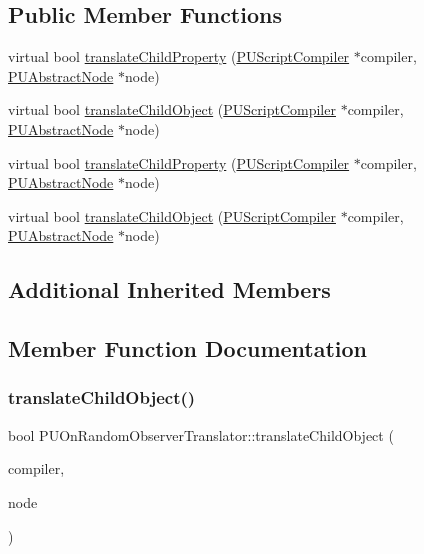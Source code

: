 \subsection*{Public Member Functions}
\begin{DoxyCompactItemize}
\item 
virtual bool \hyperlink{classPUOnRandomObserverTranslator_a33a307763b47576300326fd858593998}{translate\+Child\+Property} (\hyperlink{classPUScriptCompiler}{P\+U\+Script\+Compiler} $\ast$compiler, \hyperlink{classPUAbstractNode}{P\+U\+Abstract\+Node} $\ast$node)
\item 
virtual bool \hyperlink{classPUOnRandomObserverTranslator_a5525f9a0d010de6c1fc7ea96fa235b5d}{translate\+Child\+Object} (\hyperlink{classPUScriptCompiler}{P\+U\+Script\+Compiler} $\ast$compiler, \hyperlink{classPUAbstractNode}{P\+U\+Abstract\+Node} $\ast$node)
\item 
virtual bool \hyperlink{classPUOnRandomObserverTranslator_abd476e7be1a8439a15b0ed5ec53074e4}{translate\+Child\+Property} (\hyperlink{classPUScriptCompiler}{P\+U\+Script\+Compiler} $\ast$compiler, \hyperlink{classPUAbstractNode}{P\+U\+Abstract\+Node} $\ast$node)
\item 
virtual bool \hyperlink{classPUOnRandomObserverTranslator_a09e3fe0070c74ce00dc9d6a93cc982a6}{translate\+Child\+Object} (\hyperlink{classPUScriptCompiler}{P\+U\+Script\+Compiler} $\ast$compiler, \hyperlink{classPUAbstractNode}{P\+U\+Abstract\+Node} $\ast$node)
\end{DoxyCompactItemize}
\subsection*{Additional Inherited Members}


\subsection{Member Function Documentation}
\mbox{\label{classPUOnRandomObserverTranslator_a5525f9a0d010de6c1fc7ea96fa235b5d}} 
\subsubsection{\texorpdfstring{translate\+Child\+Object()}{translateChildObject()}\hspace{0.1cm}{\footnotesize\ttfamily [1/2]}}
{\footnotesize\ttfamily bool P\+U\+On\+Random\+Observer\+Translator\+::translate\+Child\+Object (\begin{DoxyParamCaption}\item[{\hyperlink{classPUScriptCompiler}{P\+U\+Script\+Compiler} $\ast$}]{compiler,  }\item[{\hyperlink{classPUAbstractNode}{P\+U\+Abstract\+Node} $\ast$}]{node }\end{DoxyParamCaption})\hspace{0.3cm}{\ttfamily [virtual]}}

